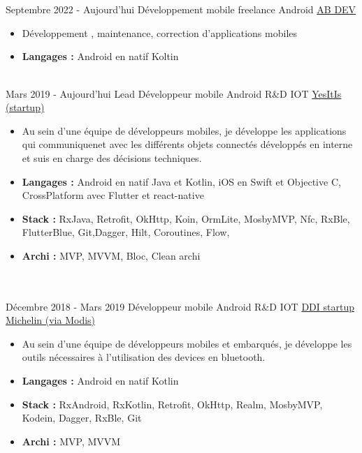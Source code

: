 \documentclass[letterpaper]{twentysecondcv} %
\begin{document}
\begin{twenty} %
 \\ \\ 
    \twentyitem
   		{Septembre 2022 -}
		{Aujourd'hui}
        {Développement mobile freelance Android }
        {\href{https://ab-dev.fr//}{AB DEV}}
        {}
        {
        {\begin{itemize}
        \item Développement , maintenance, correction d'applications mobiles
        \item  \textbf{Langages : } Android en natif Koltin 
    \end{itemize}}
    }
    \\
\twentyitem
    	{Mars 2019 -}
		{Aujourd'hui}
        {Lead Développeur mobile Android R\&D IOT}
        {\href{https://yesitis.fr/}{YesItIs (startup)}}
        {}
        {\begin{itemize}
        \item Au sein d'une équipe de développeurs mobiles, je développe les applications qui communiquenet avec les différents objets connectés développés en interne et suis en charge des décisions techniques.
         \item  \textbf{Langages : }Android en natif Java et Kotlin, iOS en Swift et Objective C, CrossPlatform avec Flutter et react-native
        \item \textbf{Stack : }RxJava, Retrofit, OkHttp, Koin, OrmLite, MosbyMVP, Nfc, RxBle, FlutterBlue, Git,Dagger, Hilt, Coroutines, Flow,
        \item \textbf{Archi : }MVP, MVVM, Bloc, Clean archi
        \end{itemize}}
        \\ \\
\twentyitem
    	{Décembre 2018 -}
		{Mars 2019}
        {Développeur mobile Android R\&D IOT}
        {\href{https://ddi.michelin.com/}{DDI startup Michelin (via Modis)}}
        {}
        {\begin{itemize}
        \item Au sein d'une équipe de développeurs mobiles et embarqués, je développe les outils nécessaires à l'utilisation des devices en bluetooth.
         \item  \textbf{Langages : }Android en natif Kotlin
        \item \textbf{Stack :} RxAndroid, RxKotlin, Retrofit, OkHttp, Realm, MosbyMVP, Kodein, Dagger, RxBle, Git 
        \item \textbf{Archi :} MVP, MVVM

\end{itemize}}
\end{twenty}
\end{document}
